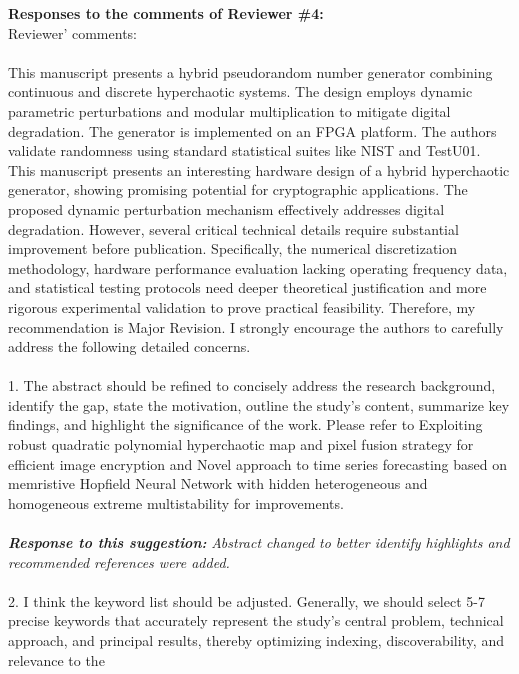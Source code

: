 \documentclass{report}
\begin{document}
\vspace{0.5cm} %

\textbf{Responses to the comments of Reviewer \#4:} \\

Reviewer' comments:
\\
\\
This manuscript presents a hybrid pseudorandom number generator combining
continuous and discrete hyperchaotic systems. The design employs dynamic parametric
perturbations and modular multiplication to mitigate digital degradation. The generator is
implemented on an FPGA platform. The authors validate randomness using standard
statistical suites like NIST and TestU01.
This manuscript presents an interesting hardware design of a hybrid hyperchaotic
generator, showing promising potential for cryptographic applications. The proposed
dynamic perturbation mechanism effectively addresses digital degradation. However,
several critical technical details require substantial improvement before publication.
Specifically, the numerical discretization methodology, hardware performance evaluation
lacking operating frequency data, and statistical testing protocols need deeper theoretical
justification and more rigorous experimental validation to prove practical feasibility.
Therefore, my recommendation is Major Revision. I strongly encourage the authors to
carefully address the following detailed concerns.
\\
\\
1. The abstract should be refined to concisely address the research background, identify
the gap, state the motivation, outline the study’s content, summarize key findings, and
highlight the significance of the work. Please refer to Exploiting robust quadratic
polynomial hyperchaotic map and pixel fusion strategy for efficient image encryption and
Novel approach to time series forecasting based on memristive Hopfield Neural Network
with hidden heterogeneous and homogeneous extreme multistability for improvements.
\\
\\
\textbf{\textit{Response to this suggestion:}}
\textit{Abstract changed to better identify highlights and recommended references were added.}
\\
\\
2. I think the keyword list should be adjusted. Generally, we should select 5-7 precise
keywords that accurately represent the study’s central problem, technical approach, and
principal results, thereby optimizing indexing, discoverability, and relevance to the
\end{document}
